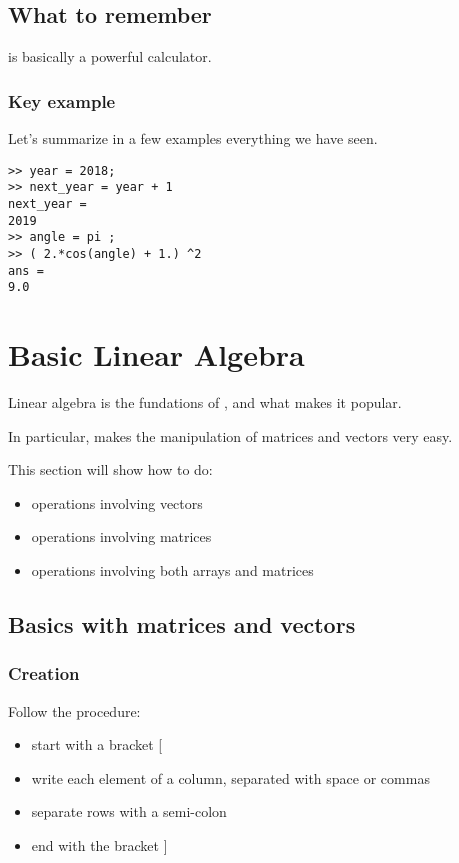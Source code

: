 \section{What to remember}

\matlab is basically a powerful calculator.

\subsection{Key example}
Let's summarize in a few examples everything we have seen.

\begin{lstlisting}
>> year = 2018;
>> next_year = year + 1
next_year = 
2019
>> angle = pi ;
>> ( 2.*cos(angle) + 1.) ^2 
ans = 
9.0
\end{lstlisting}











\chapter{Basic Linear Algebra}

Linear algebra is the fundations of \matlab, and what makes it popular.

In particular, \matlab makes the manipulation of matrices and vectors very easy.

This section will show how to do:
\begin{itemize}
	\item operations involving vectors
	\item operations involving matrices
	\item operations involving both arrays and matrices
\end{itemize}






\section{Basics with matrices and vectors}
\subsection{Creation}
Follow the procedure:
\begin{itemize}
	\item start with a bracket [
	\item write each element of a column, separated with space or commas
	\item separate rows with a semi-colon
	\item end with the bracket ]
\end{itemize}


